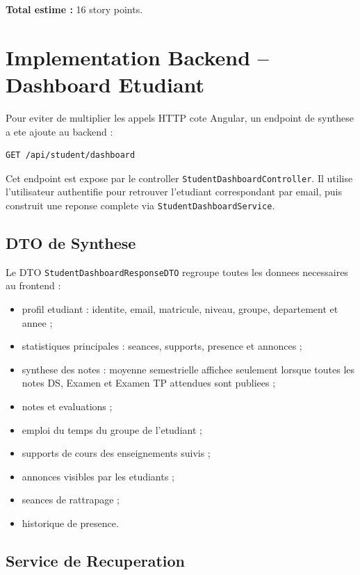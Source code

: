\documentclass[12pt,a4paper]{report}
\begin{document}
\textbf{Total estime :} 16 story points.

\section{Implementation Backend -- Dashboard Etudiant}

Pour eviter de multiplier les appels HTTP cote Angular, un endpoint de synthese a ete ajoute au backend :

\begin{verbatim}
GET /api/student/dashboard
\end{verbatim}

Cet endpoint est expose par le controller \texttt{StudentDashboardController}. Il utilise l'utilisateur authentifie pour retrouver l'etudiant correspondant par email, puis construit une reponse complete via \texttt{StudentDashboardService}.

\subsection{DTO de Synthese}

Le DTO \texttt{StudentDashboardResponseDTO} regroupe toutes les donnees necessaires au frontend :

\begin{itemize}[itemsep=0.3em]
    \item profil etudiant : identite, email, matricule, niveau, groupe, departement et annee ;
    \item statistiques principales : seances, supports, presence et annonces ;
    \item synthese des notes : moyenne semestrielle affichee seulement lorsque toutes les notes DS, Examen et Examen TP attendues sont publiees ;
    \item notes et evaluations ;
    \item emploi du temps du groupe de l'etudiant ;
    \item supports de cours des enseignements suivis ;
    \item annonces visibles par les etudiants ;
    \item seances de rattrapage ;
    \item historique de presence.
\end{itemize}

\subsection{Service de Recuperation}
\end{document}
